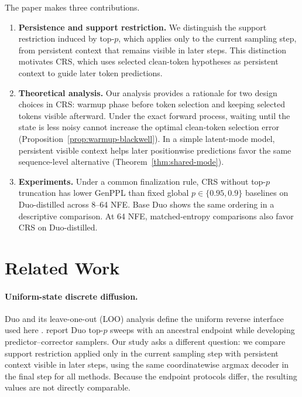 \documentclass{article}
\newcommand{\1}{\mathbf 1}
\newcommand{\CRS}{\textsc{CRS}}
\theoremstyle{definition}
\begin{document}
The paper makes three contributions.
\begin{enumerate}[leftmargin=*,itemsep=2pt,topsep=3pt]
  \item \textbf{Persistence and support restriction.} We distinguish the support restriction induced by top-$p$, which applies only to the current sampling step, from persistent context that remains visible in later steps. This distinction motivates \CRS{}, which uses selected clean-token hypotheses as persistent context to guide later token predictions.
  \item \textbf{Theoretical analysis.} Our analysis provides a rationale for two design choices in \CRS{}: warmup phase before token selection and keeping selected tokens visible afterward. Under the exact forward process, waiting until the state is less noisy cannot increase the optimal clean-token selection error (Proposition~\ref{prop:warmup-blackwell}). In a simple latent-mode model, persistent visible context helps later positionwise predictions favor the same sequence-level alternative (Theorem~\ref{thm:shared-mode}).
  \item \textbf{Experiments.} Under a common finalization rule, \CRS{} without
  top-$p$ truncation has lower GenPPL than fixed global
  $p\in\{0.95,0.9\}$ baselines on Duo-distilled across 8--64 NFE. Base Duo
  shows the same ordering in a descriptive comparison. At 64 NFE,
  matched-entropy comparisons also favor \CRS{} on Duo-distilled.
\end{enumerate}

\section{Related Work}
\label{sec:related-work}

\paragraph{Uniform-state discrete diffusion.}
Duo and its leave-one-out (LOO) analysis define the uniform reverse interface used here
\citep{sahoo2025duo,gourevitch2026uniform}.
\mbox{\citet{deschenaux2026psi}} report Duo top-$p$ sweeps with an ancestral endpoint while developing predictor--corrector samplers. Our study asks a different question: we compare support restriction applied only in the current sampling step with persistent context visible in later steps, using the same coordinatewise argmax decoder in the final step for all methods. Because the endpoint protocols differ, the resulting values are not directly comparable.
\end{document}
